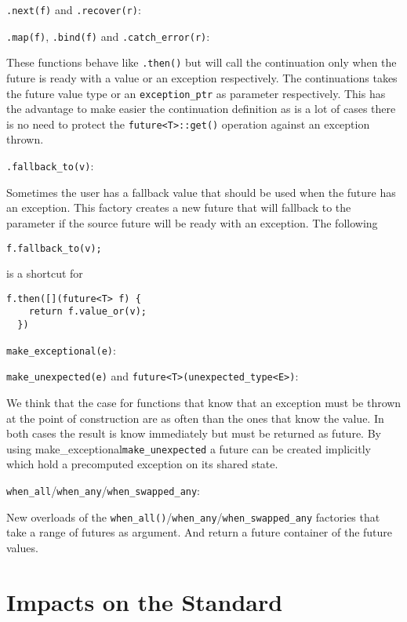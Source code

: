 \documentclass[a4paper,10pt]{article}
\newcommand{\cpp}[1]{\lstinline{#1}}
\newcommand{\suppress}[1]{\colorbox{suppress_color}{#1}}
\newcommand{\update}[1]{\colorbox{update_color}{#1}}
\begin{document}
\suppress{
\cpp{.next(f)} and \cpp{.recover(r)}:
}

\update{
\cpp{.map(f)}, \cpp{.bind(f)} and \cpp{.catch_error(r)}:
}

These functions behave like \cpp{.then()} but will call the continuation only when the future is ready with a value or an exception respectively. The continuations takes the future value type or an \cpp{exception_ptr} as parameter respectively. This has the advantage to make easier the continuation definition as is a lot of cases there is no need to protect the \cpp{future<T>::get()} operation against an exception thrown.

\cpp{.fallback_to(v)}:

Sometimes the user has a fallback value that should be used when the future has an exception. This factory creates a new future that will fallback to the parameter if the source future will be ready with an exception. The following 

\begin{lstlisting}[xleftmargin=0pt]
  f.fallback_to(v);
\end{lstlisting}

is a shortcut for 

\begin{lstlisting}[xleftmargin=0pt]
  f.then([](future<T> f) {
    return f.value_or(v);
  })
\end{lstlisting}

\suppress{
\cpp{make_exceptional(e)}:
}

\update{
\cpp{make_unexpected(e)} and \cpp{future<T>(unexpected_type<E>)}:
}

We think that the case for functions that know that an exception must be thrown at the point of construction are as often than the ones that know the value. In both cases the result is know immediately but must be returned as future. By using \suppress{make_exceptional}\update{\cpp{make_unexpected}} a future can be created implicitly which hold a precomputed exception on its shared state.  

\cpp{when_all}/\/\cpp{when_any}/\cpp{when_swapped_any}:

New overloads of the \cpp{when_all()}/\cpp{when_any}/\cpp{when_swapped_any} factories that take a range of futures as argument. And return a future container of the future values.

\section{Impacts on the Standard}
\end{document}
